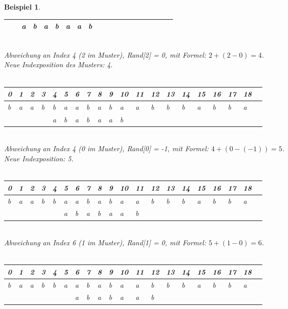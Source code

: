 \documentclass[11pt,a4paper]{scrartcl}
\newtheorem{example}{Beispiel}
\begin{document}
\begin{example}
\begin{tabular}{|l|l|l|l|l|l|l|l|l|l|l|l|l|l|l|l|l|l|l|l|}
\hline
 & &\cellcolor{green}a&\cellcolor{green}b&\cellcolor{red}a&b&a&a&b& & & & & & & & & &   \\
\hline
\end{tabular}\\
Abweichung an Index 4 (2 im Muster), Rand[2] = 0, mit Formel: $2+(2-0) = 4$. \\Neue Indexposition des Musters: 4. \\\\
\begin{tabular}{|l|l|l|l|l|l|l|l|l|l|l|l|l|l|l|l|l|l|l|l|}
\hline
0&1&2&3&4&5&6&7&8&9&10&11&12&13&14&15&16&17&18 \\
\hline
b&a&a&b&\cellcolor{red}b&a&a&b&a&b&a&a&b&b&b&a&b&b&a \\
\hline
 & & & &\cellcolor{red}a&b&a&b&a&a&b& & & & & & & &    \\
\hline
\end{tabular}\\
Abweichung an Index 4 (0 im Muster), Rand[0] = -1, mit Formel: $4+(0-(-1)) = 5$. \\ Neue Indexposition: 5. \\\\
\begin{tabular}{|l|l|l|l|l|l|l|l|l|l|l|l|l|l|l|l|l|l|l|l|}
\hline
0&1&2&3&4&5&6&7&8&9&10&11&12&13&14&15&16&17&18 \\
\hline
b&a&a&b&b&\cellcolor{green}a&\cellcolor{red}a&b&a&b&a&a&b&b&b&a&b&b&a \\
\hline
 & & & & &\cellcolor{green}a&\cellcolor{red}b&a&b&a&a&b& & & & & & &    \\
\hline
\end{tabular}\\
Abweichung an Index 6 (1 im Muster), Rand[1] = 0, mit Formel: $5+(1-0) = 6$. \\\\
\begin{tabular}{|l|l|l|l|l|l|l|l|l|l|l|l|l|l|l|l|l|l|l|l|}
\hline
0&1&2&3&4&5&6&7&8&9&10&11&12&13&14&15&16&17&18 \\
\hline
b&a&a&b&b&a&\cellcolor{green}a&\cellcolor{green}b&\cellcolor{green}a&\cellcolor{green}b&\cellcolor{green}a&\cellcolor{green}a&\cellcolor{green}b&b&b&a&b&b&a \\
\hline
 & & & & & &\cellcolor{green}a&\cellcolor{green}b&\cellcolor{green}a&\cellcolor{green}b&\cellcolor{green}a&\cellcolor{green}a&\cellcolor{green}b& & & & & &    \\
\hline
\end{tabular}\\

\end{example}
\end{document}
